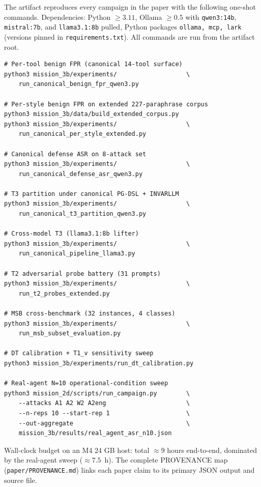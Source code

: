 The artifact reproduces every campaign in the paper with the
following one-shot commands. Dependencies: Python $\geq 3.11$, Ollama
$\geq 0.5$ with \texttt{qwen3:14b}, \texttt{mistral:7b}, and
\texttt{llama3.1:8b} pulled, Python packages
\texttt{ollama, mcp, lark} (versions pinned in
\texttt{requirements.txt}). All commands are run from the artifact
root.

\begin{small}
\begin{verbatim}
# Per-tool benign FPR (canonical 14-tool surface)
python3 mission_3b/experiments/                   \
    run_canonical_benign_fpr_qwen3.py

# Per-style benign FPR on extended 227-paraphrase corpus
python3 mission_3b/data/build_extended_corpus.py
python3 mission_3b/experiments/                   \
    run_canonical_per_style_extended.py

# Canonical defense ASR on 8-attack set
python3 mission_3b/experiments/                   \
    run_canonical_defense_asr_qwen3.py

# T3 partition under canonical PG-DSL + INVARLLM
python3 mission_3b/experiments/                   \
    run_canonical_t3_partition_qwen3.py

# Cross-model T3 (llama3.1:8b lifter)
python3 mission_3b/experiments/                   \
    run_canonical_pipeline_llama3.py

# T2 adversarial probe battery (31 prompts)
python3 mission_3b/experiments/                   \
    run_t2_probes_extended.py

# MSB cross-benchmark (32 instances, 4 classes)
python3 mission_3b/experiments/                   \
    run_msb_subset_evaluation.py

# DT calibration + T1_v sensitivity sweep
python3 mission_3b/experiments/run_dt_calibration.py

# Real-agent N=10 operational-condition sweep
python3 mission_2d/scripts/run_campaign.py        \
    --attacks A1 A2 W2 A2eng                      \
    --n-reps 10 --start-rep 1                     \
    --out-aggregate                               \
    mission_3b/results/real_agent_asr_n10.json
\end{verbatim}
\end{small}

Wall-clock budget on an M4 24 GB host: total $\approx 9$ hours
end-to-end, dominated by the real-agent sweep ($\approx 7.5$~h).
The complete PROVENANCE map (\texttt{paper/PROVENANCE.md}) links each
paper claim to its primary JSON output and source file.
